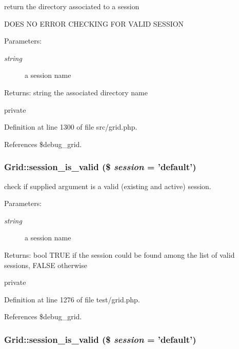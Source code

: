 return the directory associated to a session 

DOES NO ERROR CHECKING FOR VALID SESSION

\begin{Desc}
\item[Parameters:]
\begin{description}
\item[{\em string}]a session name \end{description}
\end{Desc}
\begin{Desc}
\item[Returns:]string the associated directory name\end{Desc}
private 

Definition at line 1300 of file src/grid.php.

References \$debug\_\-grid.
\subsubsection{\setlength{\rightskip}{0pt plus 5cm}Grid::session\_\-is\_\-valid (\$ {\em session} = 'default')}\label{classGrid_a41}


check if supplied argument is a valid (existing and active) session. 

\begin{Desc}
\item[Parameters:]
\begin{description}
\item[{\em string}]a session name \end{description}
\end{Desc}
\begin{Desc}
\item[Returns:]bool TRUE if the session could be found among the list of valid sessions, FALSE otherwise\end{Desc}
private 

Definition at line 1276 of file test/grid.php.

References \$debug\_\-grid.
\subsubsection{\setlength{\rightskip}{0pt plus 5cm}Grid::session\_\-is\_\-valid (\$ {\em session} = 'default')}\label{classGrid_a15}


